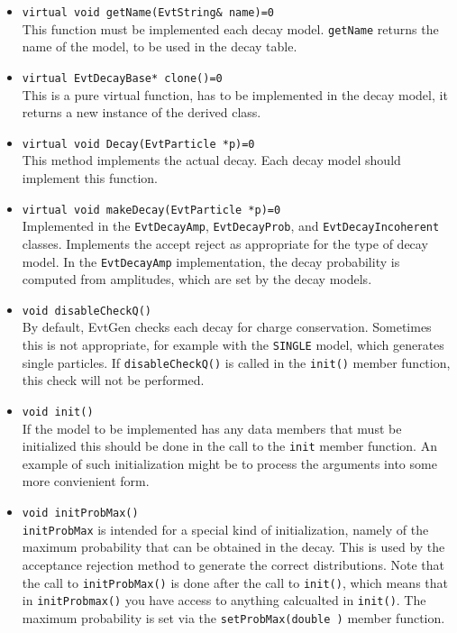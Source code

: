 \begin{itemize}
\item {\tt virtual void getName(EvtString\& name)=0}\\
      This function must be implemented each decay model.
      {\tt getName} returns the name of the model, to be used 
      in the decay table.

\item {\tt virtual EvtDecayBase* clone()=0}\\
      This is a pure virtual function, has to be implemented
      in the decay model, it returns a new instance of the 
      derived class.

\item {\tt virtual void Decay(EvtParticle *p)=0}\\
      This method implements the actual decay.  Each
      decay model should implement this function.

\item {\tt virtual void makeDecay(EvtParticle *p)=0}\\
      Implemented in the {\tt EvtDecayAmp}, {\tt EvtDecayProb}, 
      and {\tt EvtDecayIncoherent} classes. Implements
      the accept reject as appropriate for the type of
      decay model. In the {\tt EvtDecayAmp} implementation,
      the decay probability is computed from amplitudes, which 
      are set by the decay models.

\item {\tt void disableCheckQ()}\\
      By default, EvtGen checks each decay for charge conservation.
      Sometimes this is not appropriate, for example with the 
      {\tt SINGLE} model, which generates single particles.
      If {\tt disableCheckQ()} is called in the {\tt init()}
      member function, this check will not be performed.

\item {\tt void init()}\\
      If the model to be implemented has any data members that must be 
      initialized this should be done in the call to the {\tt init} 
      member function. 
      An example of such initialization might be to process the arguments 
      into some more convienient form.

\item {\tt void initProbMax()}\\
      {\tt initProbMax} is intended for a special kind of initialization, 
      namely of the maximum probability that can be obtained in the 
      decay. This is used by the acceptance rejection method to generate 
      the correct distributions. Note that the call to {\tt initProbMax()} 
      is done after the call to {\tt init()}, which means that in 
      {\tt initProbmax()} you have access to anything calcualted in 
      {\tt init()}.  The maximum probability is set via the 
      {\tt setProbMax(double )} member function.
\end{itemize}


